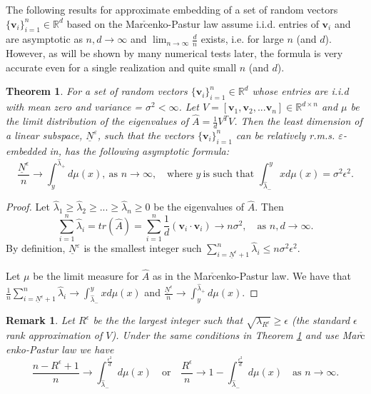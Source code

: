 \documentclass[11pt]{amsart}
\newtheorem{theorem}{Theorem}[section]
\newtheorem{remark}{Remark}[section]
\newcommand{\bv}{\mathbf{v}}
\newcommand{\eps}{\varepsilon}
\begin{document}
The following results for approximate embedding of a set of random vectors $\{\bv_i\}_{i=1}^n \in \mathbb{R}^d$ based on the Mar$\check{\text{c}}$enko-Pastur law assume i.i.d. entries of $\bv_i$ and are asymptotic as $n, d \rightarrow \infty$ and $\lim_{n\rightarrow \infty} \frac{d}{n}$ exists, i.e. for large $n$ (and $d$).  However, as will be shown by many numerical tests later, the formula is very accurate even for a single realization and quite small $n$ (and $d$).

\begin{theorem}
\label{th:asymptotics}  
For a set of random vectors $\{\bv_i\}_{i=1}^n \in \mathbb{R}^d$ whose entries are i.i.d with mean zero and variance = $\sigma^2 < \infty$. 
Let $V = [\bv_1, \bv_2, ... \bv_n] \in \mathbb R^{d\times n}$ and $\mu$ be the limit distribution of the eigenvalues of $\hat{A} = \frac{1}{d}V^TV$. 
Then the least dimension of a linear subspace, $\underline{N}^{\eps}$,  such that the vectors $\{ \bv_i\}_{i=1}^n$ can be relatively r.m.s. $\eps$-embedded in, has the following asymptotic formula:
\begin{equation}
\label{eq:Neps}
\frac{\underline{N}^{\epsilon}}{n} \rightarrow \int_{y}^{\hat{\lambda}_+} d\mu(x), ~ \mbox{as } n \rightarrow \infty, \quad \mbox{where } y ~\mbox{is such that } \int_{\hat{\lambda}_-}^{y} x d\mu(x) =  \sigma^2 \epsilon^2.
\end{equation}
\end{theorem}
\begin{proof}
Let $\hat{\lambda}_1 \geq \hat{\lambda}_2 \geq ... \geq \hat{\lambda}_n \geq 0$ be the eigenvalues of $\hat{A}$. Then
\[
\sum_{i=1}^n \hat{\lambda}_i  = tr(\hat{A}) = \sum_{i=1}^n \frac{1}{d}(\bv_i \cdot  \bv_i) \rightarrow n \sigma^2, \quad \mbox{as } n, d \rightarrow \infty.
\]
By definition, $\underline{N}^{\eps}$ is the smallest integer such  $\sum_{i=\underline{N}^{\epsilon}+1}^n \hat{\lambda}_i \leq  n \sigma^2 \epsilon^2 $.

Let $\mu$ be the limit measure for $\hat{A}$ as in the Mar$\check{\text{c}}$enko-Pastur law. We have that $\frac{1}{n} \sum_{i=\underline{N}^{\epsilon}+1}^n \hat{\lambda}_i \rightarrow \int_{\hat{\lambda}_-}^y x d\mu(x)$ and $\frac{\underline{N}^{\epsilon}}{n} \rightarrow \int_y^{\hat{\lambda}_+} d\mu(x)$.

\end{proof}

\begin{remark}
\label{re:rank}
Let $R^{\epsilon}$ be the the largest integer such that $\sqrt{\lambda_{R^{\epsilon}}}\ge \epsilon$ (the standard $\epsilon$ rank approximation of $V$). Under the same conditions in Theorem \ref{th:asymptotics} and use Mar$\check{\text{c}}$enko-Pastur law we have
\[
\frac{n-R^{\epsilon}+1}{n}\rightarrow \int_{\hat{\lambda}_-}^{\frac{\epsilon^2}{d}} d\mu(x) \quad \mbox{or} \quad \frac{R^{\epsilon}}{n}\rightarrow 1-\int_{\hat{\lambda}_-}^{\frac{\epsilon^2}{d}} d\mu(x) \quad \mbox{as } n\rightarrow \infty.
\]
\end{remark}
\end{document}
